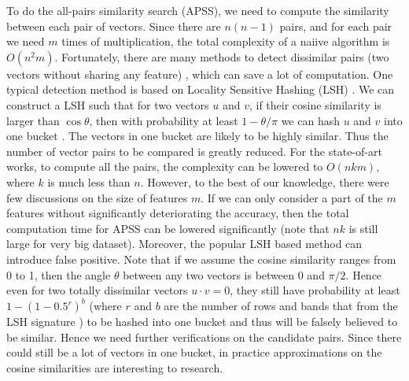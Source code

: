 \documentclass{article}
\begin{document}
To do the all-pairs similarity search (APSS), we need to compute the similarity between each pair of vectors. Since there are $n(n-1)$ pairs, and for each pair we need $m$ times of multiplication, the total complexity of a naiive algorithm is $O(n^2 m)$. Fortunately, there are many methods to detect dissimilar pairs (two vectors without sharing any feature) \cite{ATY13,TAJY14,Lin09}, which can save a lot of computation. 
{\color{black} One typical detection method is based on Locality Sensitive Hashing (LSH) \cite{LRU14}. We can construct a LSH such that for two vectors $u$ and $v$, if their cosine similarity is larger than $\cos \theta$, then with probability at least $1-\theta/\pi$ we can hash $u$ and $v$ into one bucket \cite{LRU14}. The vectors in one bucket are likely to be highly similar. Thus the number of vector pairs to be compared is greatly reduced.} 
For the state-of-art works, to compute all the pairs, the complexity can be lowered to $O(nkm)$, where $k$ is much less than $n$. However, to the best of our knowledge, there were few discussions on the size of features $m$. If we can only consider a part of the $m$ features without significantly deteriorating the accuracy, then the total computation time for APSS can be lowered significantly (note that $nk$ is still large for very big dataset). {\color{black}Moreover, the popular LSH based method can introduce false positive. Note that if we assume the cosine similarity ranges from 0 to 1, then the angle $\theta$ between any two vectors is between 0 and $\pi/2$. Hence even for two totally dissimilar vectors $u\cdot v = 0$, they still have probability at least $1 - (1-0.5^r)^b$ (where $r$ and $b$ are the number of rows and bands that from the LSH signature \cite{LRU14}) to be hashed into one bucket and thus will be falsely believed to be similar. Hence we need further verifications on the candidate pairs. Since there could still be a lot of vectors in one bucket, in practice approximations on the cosine similarities are interesting to research.}
\end{document}
